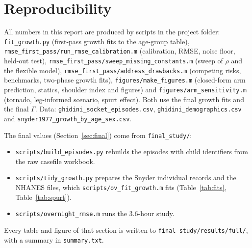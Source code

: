\documentclass[11pt]{article}
\theoremstyle{definition}
\begin{document}
\section*{Reproducibility}
All numbers in this report are produced by scripts in the project folder: \texttt{fit\_growth.py} (first-pass growth fits to the age-group table), \texttt{rmse\_first\_pass/run\_rmse\_calibration.m} (calibration, RMSE, noise floor, held-out test), \texttt{rmse\_first\_pass/sweep\_missing\_constants.m} (sweep of $\rho$ and the flexible model), \texttt{rmse\_first\_pass/address\_drawbacks.m} (competing risks, benchmarks, two-phase growth fits), \texttt{figures/make\_figures.m} (closed-form arm prediction, statics, shoulder index and figures) and \texttt{figures/arm\_sensitivity.m} (tornado, leg-informed scenario, spurt effect). Both use the final growth fits and the final $\Gamma$. Data: \texttt{ghidini\_socket\_episodes.csv}, \texttt{ghidini\_demographics.csv} and \texttt{snyder1977\_growth\_by\_age\_sex.csv}.

The final values (Section~\ref{sec:final}) come from \texttt{final\_study/}:
\begin{itemize}[leftmargin=1.4em,itemsep=1pt]
\item \texttt{scripts/build\_episodes.py} rebuilds the episodes with child identifiers from the raw casefile workbook.
\item \texttt{scripts/tidy\_growth.py} prepares the Snyder individual records and the NHANES files, which \texttt{scripts/ov\_fit\_growth.m} fits (Table~\ref{tab:fits}, Table~\ref{tab:spurt}).
\item \texttt{scripts/overnight\_rmse.m} runs the 3.6-hour study.
\end{itemize}
Every table and figure of that section is written to \texttt{final\_study/results/full/}, with a summary in \texttt{summary.txt}.
\end{document}
